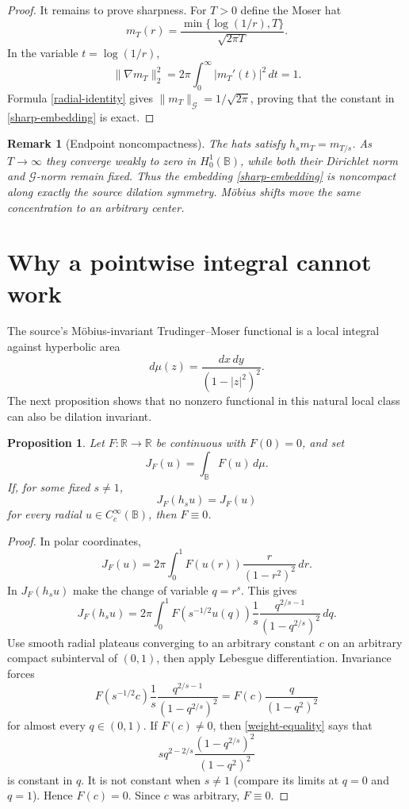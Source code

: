 \documentclass[11pt]{article}
\newtheorem{proposition}{Proposition}
\newtheorem{remark}{Remark}
\newcommand{\B}{\mathbb B}
\newcommand{\G}{\mathcal G}
\newcommand{\R}{\mathbb R}
\begin{document}
\begin{proof}
It remains to prove sharpness.  For $T>0$ define the Moser hat
\begin{equation}\label{moser-hat}
 m_T(r)=\frac{\min\{\log(1/r),T\}}{\sqrt{2\pi T}}.
\end{equation}
In the variable $t=\log(1/r)$,
\[
 \|\nabla m_T\|_2^2
 =2\pi\int_0^\infty |m_T'(t)|^2\,dt=1.
\]
Formula \eqref{radial-identity} gives
$\|m_T\|_{\G}=1/\sqrt{2\pi}$, proving that the constant in
\eqref{sharp-embedding} is exact.
\end{proof}

\begin{remark}[Endpoint noncompactness]\label{noncompact}
The hats satisfy $h_sm_T=m_{T/s}$.  As $T\to\infty$ they converge weakly
to zero in $H_0^1(\B)$, while both their Dirichlet norm and
$\G$-norm remain fixed.  Thus the embedding \eqref{sharp-embedding} is
noncompact along exactly the source dilation symmetry.  M\"obius shifts
move the same concentration to an arbitrary center.
\end{remark}

\section{Why a pointwise integral cannot work}

The source's M\"obius-invariant Trudinger--Moser functional is a local
integral against hyperbolic area
\[
 d\mu(z)=\frac{dx\,dy}{(1-|z|^2)^2}.
\]
The next proposition shows that no nonzero functional in this natural
local class can also be dilation invariant.

\begin{proposition}\label{local-no-go}
Let $F:\R\to\R$ be continuous with $F(0)=0$, and set
\[
 J_F(u)=\int_{\B}F(u)\,d\mu.
\]
If, for some fixed $s\ne1$,
\[
 J_F(h_su)=J_F(u)
\]
for every radial $u\in C_c^\infty(\B)$, then $F\equiv0$.
\end{proposition}

\begin{proof}
In polar coordinates,
\[
 J_F(u)=2\pi\int_0^1F(u(r))\frac{r}{(1-r^2)^2}\,dr.
\]
In $J_F(h_su)$ make the change of variable $q=r^s$.  This gives
\[
 J_F(h_su)=2\pi\int_0^1F(s^{-1/2}u(q))
 \frac1s\frac{q^{2/s-1}}{(1-q^{2/s})^2}\,dq.
\]
Use smooth radial plateaus converging to an arbitrary constant $c$ on
an arbitrary compact subinterval of $(0,1)$, then apply Lebesgue
differentiation.  Invariance forces
\begin{equation}\label{weight-equality}
 F(s^{-1/2}c)\frac1s\frac{q^{2/s-1}}{(1-q^{2/s})^2}
 =
 F(c)\frac{q}{(1-q^2)^2}
\end{equation}
for almost every $q\in(0,1)$.  If $F(c)\ne0$, then
\eqref{weight-equality} says that
\[
 s q^{2-2/s}\frac{(1-q^{2/s})^2}{(1-q^2)^2}
\]
is constant in $q$.  It is not constant when $s\ne1$ (compare its
limits at $q=0$ and $q=1$).  Hence $F(c)=0$.  Since $c$ was arbitrary,
$F\equiv0$.
\end{proof}
\end{document}
